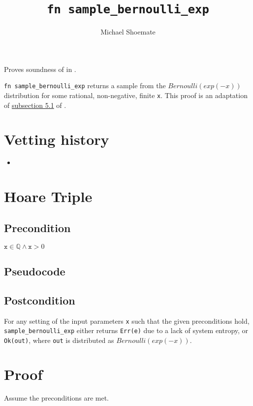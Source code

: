 \documentclass{article}
\title{\texttt{fn sample\_bernoulli\_exp}}
\author{Michael Shoemate}
\begin{document}
\maketitle

\contrib
Proves soundness of  in .

\texttt{fn sample\_bernoulli\_exp} returns a sample from the $Bernoulli(exp(-x))$ distribution for some rational, non-negative, finite \texttt{x}.
This proof is an adaptation of \href{https://arxiv.org/pdf/2004.00010.pdf#subsection.5.1}{subsection 5.1} of \cite{CKS20}.

\section*{Vetting history}
\begin{itemize}
    \item {}
\end{itemize}

\section{Hoare Triple}
\subsection*{Precondition}
$\texttt{x} \in \mathbb{Q} \land \texttt{x} > 0$

\subsection*{Pseudocode}        


\subsection*{Postcondition}
\label{postcondition}
For any setting of the input parameters \texttt{x} such that the given preconditions hold, \\
\texttt{sample\_bernoulli\_exp} either returns \texttt{Err(e)} due to a lack of system entropy,
or \texttt{Ok(out)}, where \texttt{out} is distributed as $Bernoulli(exp(-x))$.

\section{Proof}
Assume the preconditions are met.
\end{document}
